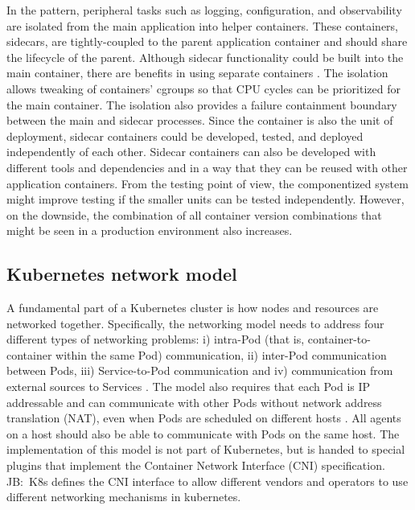 \documentclass[english, 12pt, a4paper, sci, utf8, a-2b, online]{aaltothesis}
\newcommand{\mycomment}[3]{\textcolor{#1}{#2:~#3}}
\newcommand{\jb}[1]{\noindent\mycomment{aaltoRed}{JB}{#1}}
\begin{document}
In the pattern, peripheral tasks such as logging, configuration, and observability are isolated from the main application into helper containers.
These containers, sidecars, are tightly-coupled to the parent application container and should share the lifecycle of the parent.
Although sidecar functionality could be built into the main container, there are benefits in using separate containers \cite{burns2016design}.
The isolation allows tweaking of containers' cgroups so that CPU cycles can be prioritized for the main container.
The isolation also provides a failure containment boundary between the main and sidecar processes.
Since the container is also the unit of deployment, sidecar containers could be developed, tested, and deployed independently of each other.
Sidecar containers can also be developed with different tools and dependencies and in a way that they can be reused with other application containers.
From the testing point of view, the componentized system might improve testing if the smaller units can be tested independently.
However, on the downside, the combination of all container version combinations that might be seen in a production environment also increases.

\subsection{Kubernetes network model}



A fundamental part of a Kubernetes cluster is how nodes and resources are networked together. Specifically, the networking model needs to address four different types of networking problems: i) intra-Pod (that is, container-to-container within the same Pod) communication, ii) inter-Pod communication between Pods, iii) Service-to-Pod communication and iv) communication from external sources to Services \cite{k8s-docs-cluster-networking}. The model also requires that each Pod is IP addressable and can communicate with other Pods without network address translation (NAT), even when Pods are scheduled on different hosts \cite{qi2020assessing}. All agents on a host should also be able to communicate with Pods on the same host. The implementation of this model is not part of Kubernetes, but is handed to special plugins that implement the Container Network Interface (CNI) specification.
\jb{K8s defines the CNI interface to allow different vendors and operators to use different networking mechanisms in kubernetes.}
\end{document}
